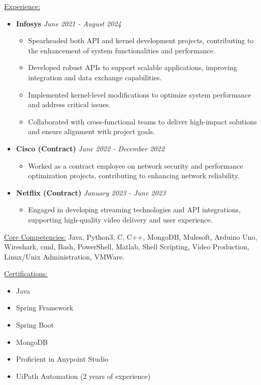 \documentclass[letterpaper,11pt]{article}
\begin{document}
	\underline{\large Experience:}
	\begin{itemize}
		\item \textbf{Infosys} \hfill \textit{June 2021 - August 2024}
		\begin{itemize}
			\item Spearheaded both API and kernel development projects, contributing to the enhancement of system functionalities and performance.
			\item Developed robust APIs to support scalable applications, improving integration and data exchange capabilities.
			\item Implemented kernel-level modifications to optimize system performance and address critical issues.
			\item Collaborated with cross-functional teams to deliver high-impact solutions and ensure alignment with project goals.
		\end{itemize}
		
		\item \textbf{Cisco (Contract)} \hfill \textit{June 2022 - December 2022}
		\begin{itemize}
			\item Worked as a contract employee on network security and performance optimization projects, contributing to enhancing network reliability.
		\end{itemize}
		
		\item \textbf{Netflix (Contract)} \hfill \textit{January 2023 - June 2023}
		\begin{itemize}
			\item Engaged in developing streaming technologies and API integrations, supporting high-quality video delivery and user experience.
		\end{itemize}
	\end{itemize}
	
	\underline{\large Core Competencies:}
	\newline
	Java, Python3, C, C++, MongoDB, Mulesoft, Arduino Uno, Wireshark, cmd, Bash, PowerShell, Matlab, Shell Scripting, Video Production, Linux/Unix Administration, VMWare.
	
	\underline{\large Certifications:}
	\begin{itemize}
		\item Java
		\item Spring Framework
		\item Spring Boot
		\item MongoDB
		\item Proficient in Anypoint Studio
		\item UiPath Automation (2 years of experience)
	\end{itemize}
	
\end{document}
